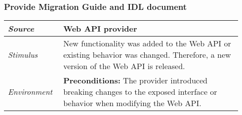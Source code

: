 \subsubsection{Provide Migration Guide and IDL document}
\label{subsubsec:UseCase:MigGuideIDL}

\vspace{-2mm}
\begin{center}
    \def\arraystretch{1.5}
    \begin{longtable}{ p{0.22\linewidth} p{0.72\linewidth} }
    \hline
        \textit{Source} & Web API provider\\
    \hline
        \textit{Stimulus} & New functionality was added to the Web API or existing behavior was changed. Therefore, a new version of the Web API is released. \\
    \hline
    	\textit{Environment} & \textbf{Preconditions:} The provider introduced breaking changes to the exposed interface or behavior when modifying the Web API.
    	

\end{longtable}
\end{center}
